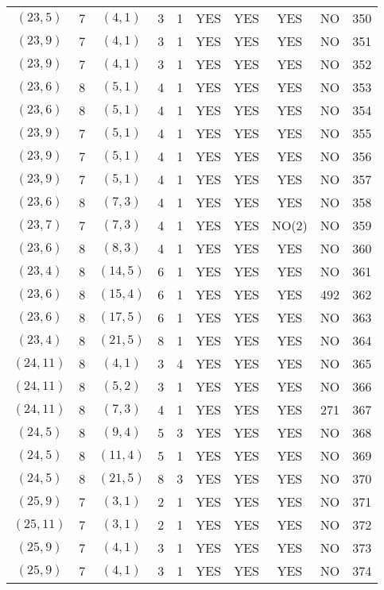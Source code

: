 \begin{longtable}{|c|c|c|c|c|c|c|c|c|c|}
$(23, 5)$ & 7 & $(4, 1)$ & 3 & 1 & YES & YES & YES & NO & 350\\
$(23, 9)$ & 7 & $(4, 1)$ & 3 & 1 & YES & YES & YES & NO & 351\\
$(23, 9)$ & 7 & $(4, 1)$ & 3 & 1 & YES & YES & YES & NO & 352\\
$(23, 6)$ & 8 & $(5, 1)$ & 4 & 1 & YES & YES & YES & NO & 353\\
$(23, 6)$ & 8 & $(5, 1)$ & 4 & 1 & YES & YES & YES & NO & 354\\
$(23, 9)$ & 7 & $(5, 1)$ & 4 & 1 & YES & YES & YES & NO & 355\\
$(23, 9)$ & 7 & $(5, 1)$ & 4 & 1 & YES & YES & YES & NO & 356\\
$(23, 9)$ & 7 & $(5, 1)$ & 4 & 1 & YES & YES & YES & NO & 357\\
$(23, 6)$ & 8 & $(7, 3)$ & 4 & 1 & YES & YES & YES & NO & 358\\
$(23, 7)$ & 7 & $(7, 3)$ & 4 & 1 & YES & YES & NO(2) & NO & 359\\
$(23, 6)$ & 8 & $(8, 3)$ & 4 & 1 & YES & YES & YES & NO & 360\\
$(23, 4)$ & 8 & $(14, 5)$ & 6 & 1 & YES & YES & YES & NO & 361\\
$(23, 6)$ & 8 & $(15, 4)$ & 6 & 1 & YES & YES & YES & 492 & 362\\
$(23, 6)$ & 8 & $(17, 5)$ & 6 & 1 & YES & YES & YES & NO & 363\\
$(23, 4)$ & 8 & $(21, 5)$ & 8 & 1 & YES & YES & YES & NO & 364\\
$(24, 11)$ & 8 & $(4, 1)$ & 3 & 4 & YES & YES & YES & NO & 365\\
$(24, 11)$ & 8 & $(5, 2)$ & 3 & 1 & YES & YES & YES & NO & 366\\
$(24, 11)$ & 8 & $(7, 3)$ & 4 & 1 & YES & YES & YES & 271 & 367\\
$(24, 5)$ & 8 & $(9, 4)$ & 5 & 3 & YES & YES & YES & NO & 368\\
$(24, 5)$ & 8 & $(11, 4)$ & 5 & 1 & YES & YES & YES & NO & 369\\
$(24, 5)$ & 8 & $(21, 5)$ & 8 & 3 & YES & YES & YES & NO & 370\\
$(25, 9)$ & 7 & $(3, 1)$ & 2 & 1 & YES & YES & YES & NO & 371\\
$(25, 11)$ & 7 & $(3, 1)$ & 2 & 1 & YES & YES & YES & NO & 372\\
$(25, 9)$ & 7 & $(4, 1)$ & 3 & 1 & YES & YES & YES & NO & 373\\
$(25, 9)$ & 7 & $(4, 1)$ & 3 & 1 & YES & YES & YES & NO & 374\\

\end{longtable}

